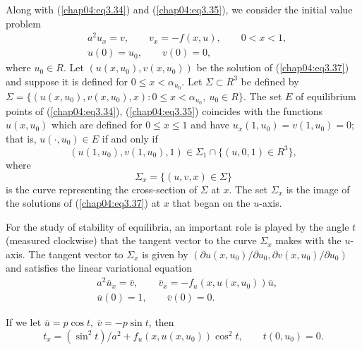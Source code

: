 \documentclass{surv-l}
\theoremstyle{plain}
\theoremstyle{definition}
\numberwithin{equation}{section}
\numberwithin{figure}{chapter}
\begin{document}
Along with (\ref{chap04:eq3.34}) and (\ref{chap04:eq3.35}), we consider the initial value problem
\begin{equation}\label{chap04:eq3.37}
\begin{split}
&a^{2}u_{x}=v,\qquad v_{x}=-f(x, u),\qquad 0<x<1,\\
&u(0)=u_{0},\qquad v(0)=0,
\end{split}
\end{equation}
where $u_{0}\in R$. Let $(u(x, u_{0}), v(x, u_{0}))$ be the solution of (\ref{chap04:eq3.37}) and suppose it is defined for $0\leq x<\alpha_{u_{0}}$. Let $\Sigma\subset R^{3}$ be defined by $\Sigma=\{(u(x, u_{0}), v(x, u_{0}),x)\!:0\leq x<\alpha_{u_{0}},\ u_{0}\in R\}$. The set $E$ of equilibrium points of (\ref{chap04:eq3.34}), (\ref{chap04:eq3.35}) coincides with the functions $u(x, u_{0})$ which are defined for $0\leq x\leq 1$ and have $u_{x}(1, u_{0})=v(1, u_{0})=0$; that is, $u(\cdot, u_{0})\in E$ if and only if
\begin{equation*}
(u(1, u_{0}), v(1, u_{0}), 1)\in\Sigma_{1}\cap\{(u, 0,1)\in R^{3}\},
\end{equation*}
where
\begin{equation*}
\Sigma_{x}=\{(u, v, x)\in\Sigma\}
\end{equation*}
is the curve representing the cross-section of $\Sigma$ at $x$. The set $\Sigma_{x}$ is the image of the solutions of (\ref{chap04:eq3.37}) at $x$ that began on the $u$-axis.

For the study of stability of equilibria, an important role is played by the angle $t$ (measured clockwise) that the tangent vector to the curve $\Sigma_{x}$ makes with the $u$-axis. The tangent vector to $\Sigma_{x}$ is given by $(\partial u(x, u_{0})/\partial u_{0}, \partial v(x, u_{0})/\partial u_{0})$ and satisfies the linear variational equation
\begin{equation}\label{chap04:eq3.38}
\begin{split}
&a^{2}\overline{u}_{x}=\overline{v}, \qquad \overline{v}_{x}=-f_{u}(x, u(x, u_{0}))\overline{u},\\
&\overline{u}(0)=1, \qquad \overline{v}(0)=0.
\end{split}
\end{equation}

If we let $\overline{u}=p\cos t,\ \overline{v}=-p\sin t$, then
\begin{equation}\label{chap04:eq3.39}
t_{x}=(\sin^{2}t)/a^{2}+f_{u}(x, u(x, u_{0}))\cos^{2}t,\qquad t(0, u_{0})=0.
\end{equation}
\end{document}

